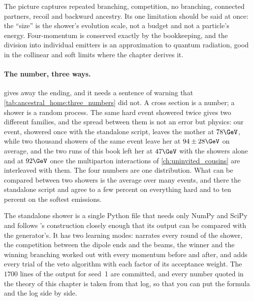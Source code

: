 The picture captures repeated branching, competition, no branching,
connected partners, recoil and backward ancestry. Its one limitation should
be said at once: the ``size'' is the shower's evolution scale, not a budget
and not a particle's energy. Four-momentum is conserved exactly by the
bookkeeping, and the division into individual emitters is an approximation
to quantum radiation, good in the collinear and soft limits where the
chapter derives it.

\paragraph{The number, three ways.}
\label{sec:mother_gives_birth:validation}
\label{sec:mother_gives_birth:standalone_code}
 gives away the ending, and it needs a
sentence of warning that \cref{tab:ancestral_home:three_numbers} did not.
A cross section is a number; a shower is a random process. The same hard
event showered twice gives two different families, and the spread between
them is not an error but physics: our event, showered once with the
standalone script, leaves the mother at $78\GeV$, while two thousand showers
of the same event leave her at $94\pm28\GeV$ on average, and the two \CMSSW
runs of this book left her at $47\GeV$ with the showers alone and at
$92\GeV$ once the multiparton interactions of \cref{ch:uninvited_cousins}
are interleaved with them. The four numbers are one distribution. What can be
compared between two showers is the average over many events, and there the
standalone script and \PYTHIA agree to a few percent on everything hard and
to ten percent on the softest emissions.

The standalone shower is a single Python file that needs only NumPy and
SciPy and follows \PYTHIA's construction closely enough that its output can
be compared with the generator's. It has two learning modes: 
narrates every round of the shower, the competition between the dipole ends
and the beams, the winner and the winning branching worked out with every
momentum before and after, and  adds every trial of the veto
algorithm with each factor of its acceptance weight. The $1700$ lines of the
 output for seed~1 are committed, and every number quoted in the
theory of this chapter is taken from that log, so that you can put the
formula and the log side by side.
\label{sec:mother_gives_birth:pythia}

